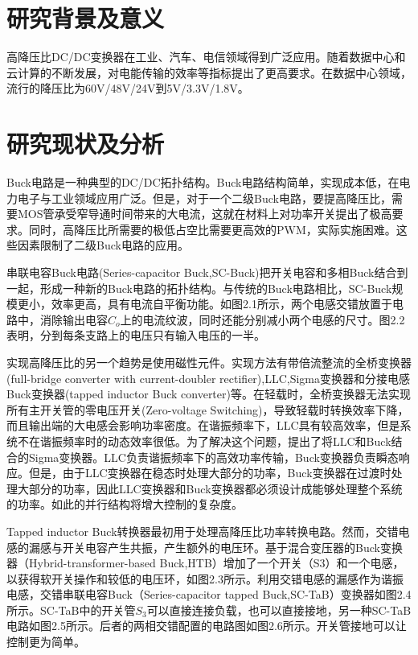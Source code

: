 \documentclass[12pt,a4paper]{report}
\begin{document}
\chapter{研究背景及意义}
高降压比DC/DC变换器在工业、汽车、电信领域得到广泛应用。随着数据中心和云计算的不断发展，对电能传输的效率等指标提出了更高要求。在数据中心领域，流行的降压比为60V/48V/24V到5V/3.3V/1.8V。
\chapter{研究现状及分析}
Buck电路是一种典型的DC/DC拓扑结构。Buck电路结构简单，实现成本低，在电力电子与工业领域应用广泛。但是，对于一个二级Buck电路，要提高降压比，需要MOS管承受窄导通时间带来的大电流，这就在材料上对功率开关提出了极高要求。同时，高降压比所需要的极低占空比需要更高效的PWM，实际实施困难。这些因素限制了二级Buck电路的应用。


串联电容Buck电路(Series-capacitor Buck,SC-Buck)把开关电容和多相Buck结合到一起，形成一种新的Buck电路的拓扑结构。与传统的Buck电路相比，SC-Buck规模更小，效率更高，具有电流自平衡功能。如图2.1所示，两个电感交错放置于电路中，消除输出电容$C_o$上的电流纹波，同时还能分别减小两个电感的尺寸。图2.2表明，分到每条支路上的电压只有输入电压的一半。


实现高降压比的另一个趋势是使用磁性元件。实现方法有带倍流整流的全桥变换器(full-bridge converter with current-doubler rectifier),LLC,Sigma变换器和分接电感Buck变换器(tapped inductor Buck converter)等。在轻载时，全桥变换器无法实现所有主开关管的零电压开关(Zero-voltage Switching)，导致轻载时转换效率下降，而且输出端的大电感会影响功率密度。在谐振频率下，LLC具有较高效率，但是系统不在谐振频率时的动态效率很低。为了解决这个问题，提出了将LLC和Buck结合的Sigma变换器。LLC负责谐振频率下的高效功率传输，Buck变换器负责瞬态响应。但是，由于LLC变换器在稳态时处理大部分的功率，Buck变换器在过渡时处理大部分的功率，因此LLC变换器和Buck变换器都必须设计成能够处理整个系统的功率。如此的并行结构将增大控制的复杂度。


Tapped inductor Buck转换器最初用于处理高降压比功率转换电路。然而，交错电感的漏感与开关电容产生共振，产生额外的电压环。基于混合变压器的Buck变换器（Hybrid-transformer-based Buck,HTB）增加了一个开关（S3）和一个电感，以获得软开关操作和较低的电压环，如图2.3所示。利用交错电感的漏感作为谐振电感，交错串联电容Buck（Series-capacitor tapped Buck,SC-TaB）变换器如图2.4所示。SC-TaB中的开关管$S_3$可以直接连接负载，也可以直接接地，另一种SC-TaB电路如图2.5所示。后者的两相交错配置的电路图如图2.6所示。开关管接地可以让控制更为简单。
\end{document}
